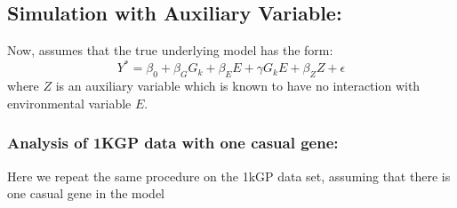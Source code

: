 \documentclass[
]{article}
\begin{document}
\clearpage

\hypertarget{simulation-with-auxiliary-variable}{%
\subsection{Simulation with Auxiliary
Variable:}\label{simulation-with-auxiliary-variable}}

Now, assumes that the true underlying model has the form:
\[Y^* = \beta_0 + \beta_GG_k + \beta_EE+\gamma G_kE +\beta_ZZ + \epsilon\]
where \(Z\) is an auxiliary variable which is known to have no
interaction with environmental variable \(E\).

\hypertarget{analysis-of-1kgp-data-with-one-casual-gene}{%
\subsubsection{Analysis of 1KGP data with one casual
gene:}\label{analysis-of-1kgp-data-with-one-casual-gene}}

Here we repeat the same procedure on the 1kGP data set, assuming that
there is one casual gene in the model
\end{document}
